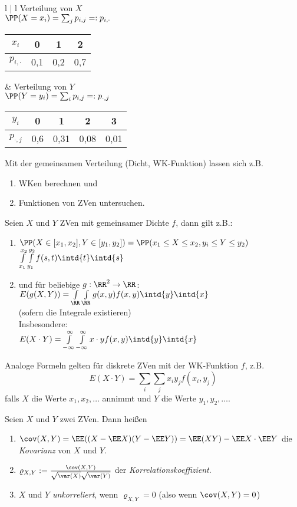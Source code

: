 \documentclass{scrreprt}
\renewenvironment{anumerate}{\begin{enumerate}[label=(\alph*)]}{\end{enumerate}} %
\begin{document}
\begin{itemize}
\begin{tabular}{l | l}
\mpb[.4]
Verteilung von $X$\\
$\PP(X=x_i)=\sum_j p_{i,j}=:p_{i,\cdot}$\\
\begin{tabular}{c | c c c}
$x_i$ & 0 & 1 & 2\\\hline
$p_{i,\cdot}$ & 0,1 & 0,2 & 0,7
\end{tabular}
\mpe &
\mpb[.4]
Verteilung von $Y$\\
$\PP(Y=y_i)=\sum_i p_{i,j}=:p_{\cdot,j}$\\
\begin{tabular}{c | c c c c}
$y_i$ & 0 & 1 & 2 & 3\\\hline
$p_{\cdot,j}$ & 0,6 & 0,31 & 0,08 & 0,01
\end{tabular}
\mpe
\end{tabular}
\end{itemize}

 Mit der gemeinsamen Verteilung (Dicht, WK-Funktion) lassen sich z.B.
\begin{enumerate}
\item WKen berechnen und
\item Funktionen von ZVen untersuchen.
\end{enumerate}
Seien $X$ und $Y$ ZVen mit gemeinsamer Dichte $f$, dann gilt z.B.:
\begin{enumerate}
\item $\PP(X\in [x_1, x_2], Y\in [y_1, y_2]) = \PP(x_1\leq X \leq x_2, y_i \leq Y \leq y_2)$\\
$\int\limits_{x_1}^{x_2}\int\limits_{y_1}^{y_2} f(s,t) \intd{t}\intd{s}$
\item und für beliebige $g: \RR^2 \to \RR$:\\
$E(g(X,Y)) = \int\limits_\RR\int\limits_\RR g(x,y) f(x,y) \intd{y}\intd{x}$\\
(sofern die Integrale existieren)\\
Insbesondere:\\
$E(X\cdot Y) = \int\limits_{-\infty}^{\infty}\int\limits_{-\infty}^{\infty}x\cdot y f(x,y) \intd{y}\intd{x}$
\end{enumerate}
Analoge Formeln gelten für diskrete ZVen mit der WK-Funktion $f$, z.B. 
$$E(X\cdot Y)=\sum_i \sum_j x_i y_j f(x_i, y_j)$$
falls $X$ die Werte $x_1, x_2, \dots$ annimmt und $Y$ die Werte $y_1, y_2, \dots$.

 Seien $X$ und $Y$ zwei ZVen. Dann heißen
\begin{anumerate}
\item $\cov(X,Y) = \EE((X-\EE X) ( Y - \EE Y)) = \EE (XY) - \EE X \cdot \EE Y$ die \emph{Kovarianz} von $X$ und $Y$.
\item $\varrho_{X,Y}:=\frac{\cov(X,Y)}{\sqrt{\var(X)}\sqrt{\var(Y)}}$ der \emph{Korrelationskoeffizient}.
\item $X$ und $Y$ \emph{unkorreliert}, wenn $\varrho_{X,Y}=0$ (also wenn $\cov(X,Y) = 0$)
\end{anumerate}
\end{document}
